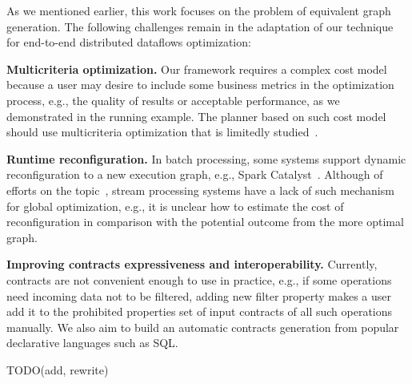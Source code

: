 As we mentioned earlier, this work focuses on the problem of equivalent graph generation. The following challenges remain in the adaptation of our technique for end-to-end distributed dataflows optimization:

\textbf{Multicriteria optimization.}
Our framework requires a complex cost model because a user may desire to include some business metrics in the optimization process, e.g., the quality of results or acceptable performance, as we demonstrated in the running example. The planner based on such cost model should use multicriteria optimization that is limitedly studied~\cite{yarygina2014optimizing}.

\textbf{Runtime reconfiguration.}
In batch processing, some systems support dynamic reconfiguration to a new execution graph, e.g., Spark Catalyst~\cite{armbrust2015spark}. Although of efforts on the topic~\cite{grulich2020grizzly, 10.14778/3329772.3329777}, stream processing systems have a lack of such mechanism for global optimization, e.g., it is unclear how to estimate the cost of reconfiguration in comparison with the potential outcome from the more optimal graph.

\textbf{Improving contracts expressiveness and interoperability.}
Currently, contracts are not convenient enough to use in practice, e.g., if some operations need incoming data not to be filtered, adding new filter property makes a user add it to the prohibited properties set of input contracts of all such operations manually. We also aim to build an automatic contracts generation from popular declarative languages such as SQL.

TODO(add, rewrite)
